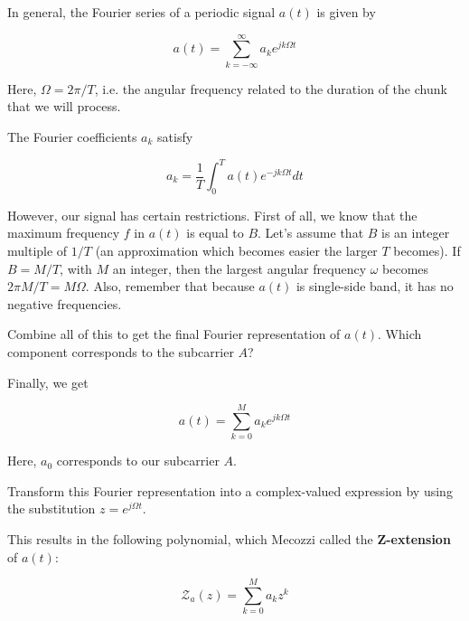 In general, the Fourier series of a periodic signal $a(t)$ is given by

\begin{equation}
a(t) = \sum_{k=-\infty}^\infty a_k e^{jk\Omega t}
\end{equation}

\noindent{}Here, $\Omega=2 \pi / T$, i.e. the angular frequency related to the duration of the chunk that we will process.

The Fourier coefficients $a_k$ satisfy

\begin{equation}
a_k = \frac{1}{T} \int_0^T a(t) e ^{-jk\Omega t} dt
\end{equation}
    
However, our signal has certain restrictions. First of all, we know that the maximum frequency $f$ in $a(t)$ is equal to $B$. Let's assume that $B$ is an integer multiple of $1/T$ (an approximation which becomes easier the larger $T$ becomes). If $B=M/T$,  with $M$ an integer, then the largest angular frequency $\omega$ becomes $2 \pi M/T = M \Omega$. Also, remember that because $a(t)$ is single-side band, it has no negative frequencies.

\begin{cue}
Combine all of this to get the final Fourier representation of $a(t)$. Which component corresponds to the subcarrier $A$?
\end{cue}

Finally, we get

\begin{equation}
a(t) = \sum_{k=0}^M a_k e^{jk\Omega t}
\label{eq-a-fourier}
\end{equation}

Here, $a_0$ corresponds to our subcarrier $A$.

\begin{cue}
Transform this Fourier representation into a complex-valued expression by using the substitution $z=e^{j\Omega t}$.
\end{cue}

\noindent{}This results in the following polynomial, which Mecozzi called the \textbf{Z-extension} of $a(t)$:

\begin{equation}
\mathcal{Z}_a(z) = \sum_{k=0}^{M} a_k z^k
\end{equation}

